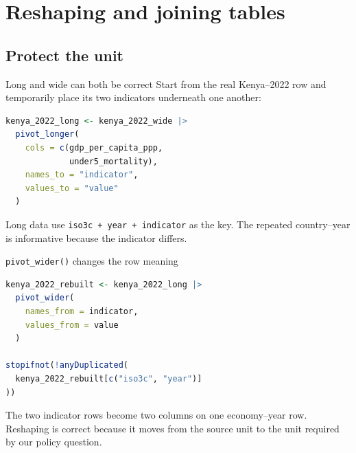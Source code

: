 \section{Reshaping and joining tables}
\subsection{Protect the unit}

\begin{frame}[fragile]{Long and wide can both be correct}
  Start from the real Kenya--2022 row and temporarily place its two indicators
  underneath one another:

\begin{lstlisting}[language=R]
kenya_2022_long <- kenya_2022_wide |>
  pivot_longer(
    cols = c(gdp_per_capita_ppp,
             under5_mortality),
    names_to = "indicator",
    values_to = "value"
  )
\end{lstlisting}

  Long data use \texttt{iso3c + year + indicator} as the key. The repeated
  country--year is informative because the indicator differs.
\end{frame}

\begin{frame}[fragile]{\texttt{pivot\_wider()} changes the row meaning}
\begin{lstlisting}[language=R]
kenya_2022_rebuilt <- kenya_2022_long |>
  pivot_wider(
    names_from = indicator,
    values_from = value
  )

stopifnot(!anyDuplicated(
  kenya_2022_rebuilt[c("iso3c", "year")]
))
\end{lstlisting}

  The two indicator rows become two columns on one economy--year row. Reshaping
  is correct because it moves from the source unit to the unit required by our
  policy question.
\end{frame}

